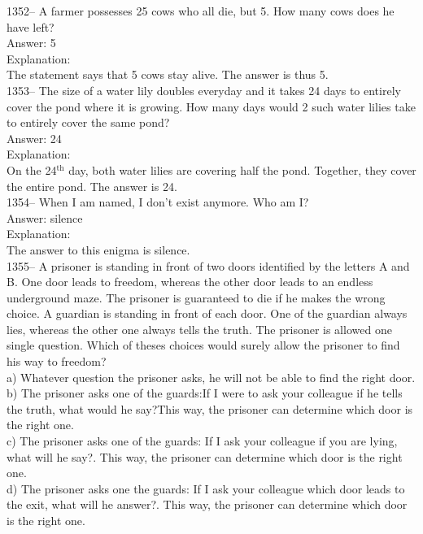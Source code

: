 \documentclass[letterpaper, 12pt]{article}
\begin{document}
1352-- A farmer possesses 25 cows who all die, but 5. How many cows does he have left?\\

Answer: 5\\

Explanation:\\
The statement says that 5 cows stay alive. The answer is thus 5.\\

1353-- The size of a water lily doubles everyday and it takes 24 days to entirely cover the pond where it is growing. How many days would 2 such water lilies take to entirely cover the same pond?\\

Answer: 24\\

Explanation: \\
On the 24$^{\textrm{th}}$ day, both water lilies are covering half the pond. Together, they cover the entire pond. The answer is 24.\\

1354-- When I am named, I don't exist anymore. Who am I?\\

Answer: silence\\

Explanation: \\
The answer to this enigma is silence.\\

1355--
A prisoner is standing in front of two doors identified by the letters A and B. One door leads to freedom, whereas the other door leads to an endless underground maze. The prisoner is guaranteed to die if he makes the wrong choice. A guardian is standing in front of each door. One of the guardian always lies, whereas the other one always tells the truth. The prisoner is allowed one single question. Which of theses choices would surely allow the prisoner to find his way to freedom?\\

a) Whatever question the prisoner asks, he will not be able to find the right door.\\
b) The prisoner asks one of the guards:\og If I were to ask your colleague if he tells the truth, what would he say?\fg This way, the prisoner can determine which door is the right one.\\
c) The prisoner asks one of the guards: \og If I ask your colleague if you are lying, what will he say?\fg. This way, the prisoner can determine which door is the right one.\\
d) The prisoner asks one the guards: \og If I ask your colleague which door leads to the exit, what will he answer?\fg . This way, the prisoner can determine which door is the right one.\\
\end{document}
